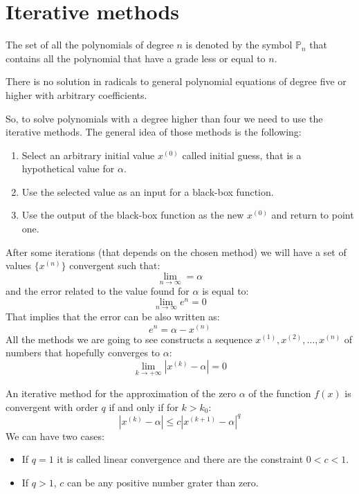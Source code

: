 \documentclass[12pt, a4paper]{report}
\newtheorem[style=M,bodystyle=\normalfont]{theorem}{Theorem}
\newtheorem[style=M,bodystyle=\normalfont]{corollary}{Corollary}
\newtheorem[style=M,bodystyle=\normalfont]{lemma}{Lemma}
\newtheorem[style=M,bodystyle=\normalfont]{definition}{Definition}
\begin{document}
    \section{Iterative methods}
    The set of all the polynomials of degree $n$ is denoted by the symbol $\mathbb{P}_n$ that contains all the polynomial that have a grade less or equal to $n$.
    \begin{theorem}
        There is no solution in radicals to general polynomial equations of degree five or higher with arbitrary coefficients. 
    \end{theorem}
    So, to solve polynomials with a degree higher than four we need to use the iterative methods. The general idea of those methods is the following:
    \begin{enumerate}
        \item Select an arbitrary initial value $x^{(0)}$ called initial guess, that is a hypothetical value for $\alpha$.
        \item Use the selected value as an input for a black-box function.
        \item Use the output of the black-box function as the new $x^{(0)}$ and return to point one. 
    \end{enumerate}
    After some iterations (that depends on the chosen method) we will have a set of values $\{ x^{(n)} \}$ convergent such that:
    \[ \lim_{n \rightarrow \infty} = \alpha\]
    and the error related to the value found for $\alpha$ is equal to: 
    \[ \lim_{n \rightarrow \infty}e^n = 0\]
    That implies that the error can be also written as: 
    \[e^n=\alpha-x^{(n)}\]
    All the methods we are going to see constructs a sequence $x^{(1)},x^{(2)},\dots,x^{(n)}$ of numbers that hopefully converges to $\alpha$:
    \[ \lim_{k \rightarrow + \infty} \left\lvert x^{(k)}-\alpha \right\rvert =0\]
    \begin{definition}
        An iterative method for the approximation of the zero $\alpha$ of the function $f(x)$ is convergent with order $q$ if and only if for $k > k_0$:
        \[\left\lvert x^{(k)} - \alpha \right\rvert \leq c {\left\lvert x^{(k+1)} - \alpha \right\rvert}^q  \]
        We can have two cases:
        \begin{itemize}
            \item If $q=1$ it is called linear convergence and there are the constraint $0<c<1$.
            \item If $q>1$, $c$ can be any positive number grater than zero. 
        \end{itemize}
    \end{definition}
\end{document}
